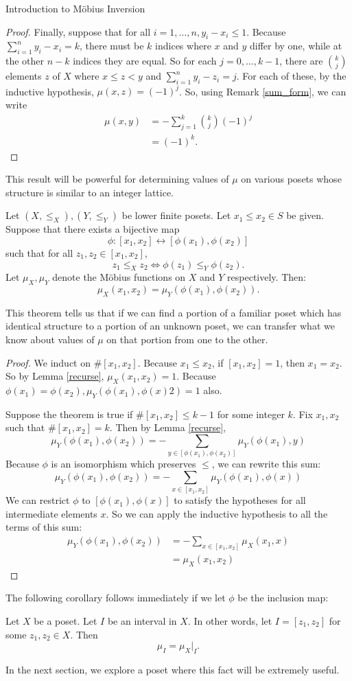 \documentclass[12pt]{pom_thesis}
\begin{document}
\begin{chapter}{Introduction to M\"obius Inversion}
\begin{proof}
Finally, suppose that for all $i = 1,\dots,n, y_i-x_i \leq 1$. Because $\sum_{i=1}^ny_i-x_i =k$, there must be $k$ indices where $x$ and $y$ differ by one, while at the other $n-k$ indices they are equal. So for each $j = 0,\dots,k-1$, there are $k \choose j$ elements $z$ of $X$ where $x \leq z < y$ and $\sum_{i = 1}^n y_i-z_i = j$. For each of these, by the inductive hypothesis, $\mu(x,z) = (-1)^j$. So, using Remark \ref{sum_form}, we can write
\begin{align*}
\mu(x,y)& = -\sum_{j = 1}^k {k \choose j} (-1)^j\\
&= (-1)^k.
\end{align*}
\end{proof}
This result will be powerful for determining values of $\mu$ on various posets whose structure is similar to an integer lattice. 
\begin{thm}\label{mapping}
Let $(X, \leq_X),(Y, \leq_Y)$ be lower finite posets. Let $x_1 \leq x_2 \in S$ be given. Suppose that there exists a bijective map
\[
\phi: [x_1, x_2] \leftrightarrow [\phi(x_1), \phi(x_2)]
\]
such that for all $z_1, z_2 \in [x_1, x_2]$,
\[ 
z_1 \leq_X z_2 \iff \phi(z_1) \leq_Y \phi(z_2).
\] 
Let $\mu_X, \mu_Y$ denote the M\"obius functions on $X$ and $Y$ respectively. Then:
\[
\mu_X(x_1, x_2) = \mu_Y(\phi(x_1), \phi(x_2)).
\]
\end{thm}
This theorem tells us that if we can find a portion of a familiar poset which has identical structure to a portion of an unknown poset, we can transfer what we know about values of $\mu$ on that portion from one to the other.
\begin{proof}
We induct on $\#[x_1, x_2]$. Because $x_1 \leq x_2$, if $[x_1, x_2] = 1$, then $x_1 = x_2$. So by Lemma \ref{recurse}, $\mu_X(x_1, x_2) = 1$. Because $\phi(x_1) = \phi(x_2), \mu_Y(\phi(x_1), \phi(x)2) = 1$ also.

Suppose the theorem is true if $\#[x_1, x_2] \leq k-1$ for some integer $k$. Fix $x_1, x_2$ such that $\#[x_1, x_2] = k$. Then by Lemma \ref{recurse},
\[
\mu_Y(\phi(x_1), \phi(x_2)) = -\sum_{y \in [\phi(x_1), \phi(x_2)]}\mu_Y(\phi(x_1), y)
\]
Because $\phi$ is an isomorphism which preserves $\leq$, we can rewrite this sum:
\[
\mu_Y(\phi(x_1), \phi(x_2)) = -\sum_{x \in [x_1, x_2]}\mu_Y(\phi(x_1), \phi(x))
\]
We can restrict $\phi$ to $[\phi(x_1), \phi(x)]$ to satisfy the hypotheses for all intermediate elements $x$. So we can apply the inductive hypothesis to all the terms of this sum:
\begin{align*}
\mu_Y(\phi(x_1), \phi(x_2)) &= -\sum_{x \in [x_1, x_2]}\mu_X(x_1, x)\\
&= \mu_X(x_1, x_2)
\end{align*}
\end{proof}
The following corollary follows immediately if we let $\phi$ be the inclusion map:
\begin{cor}\label{subset}
Let $X$ be a poset. Let $I$ be an interval in $X$. In other words, let $I = [z_1, z_2]$ for some $z_1, z_2 \in X$. Then
\[
\mu_I = \mu_X|_I.
\]
\end{cor}
In the next section, we explore a poset where this fact will be extremely useful. 


\end{chapter}
\end{document}
